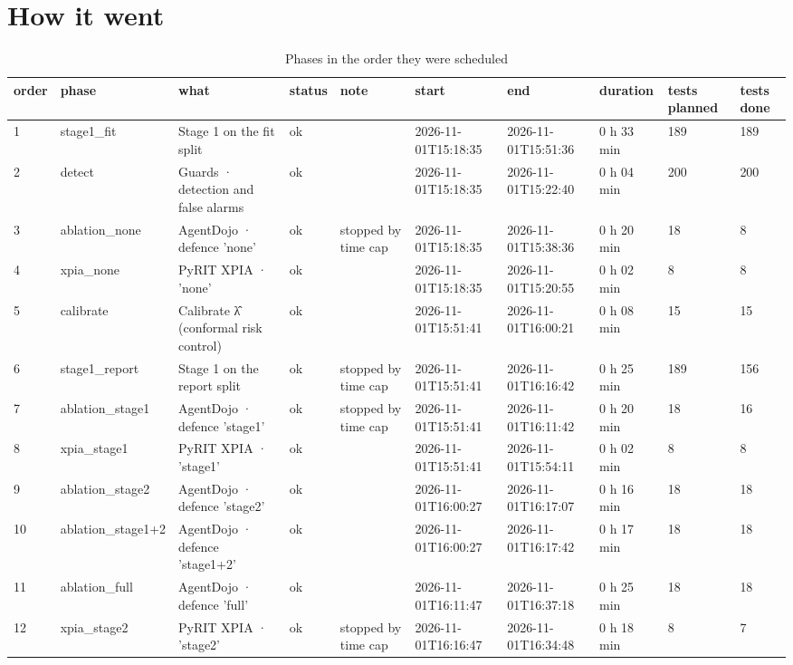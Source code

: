 \documentclass[11pt,a4paper]{article}
\begin{document}
\section*{How it went}
\begin{small}\begin{longtable}{llllllllll}
\caption{Phases in the order they were scheduled}\\
\toprule
order & phase & what & status & note & start & end & duration & tests planned & tests done \\
\midrule\endhead
1 & stage1\_fit & Stage 1 on the fit split & ok &  & 2026-11-01T15:18:35 & 2026-11-01T15:51:36 & 0 h 33 min & 189 & 189 \\
2 & detect & Guards · detection and false alarms & ok &  & 2026-11-01T15:18:35 & 2026-11-01T15:22:40 & 0 h 04 min & 200 & 200 \\
3 & ablation\_none & AgentDojo · defence 'none' & ok & stopped by time cap & 2026-11-01T15:18:35 & 2026-11-01T15:38:36 & 0 h 20 min & 18 & 8 \\
4 & xpia\_none & PyRIT XPIA · 'none' & ok &  & 2026-11-01T15:18:35 & 2026-11-01T15:20:55 & 0 h 02 min & 8 & 8 \\
5 & calibrate & Calibrate λ̂ (conformal risk control) & ok &  & 2026-11-01T15:51:41 & 2026-11-01T16:00:21 & 0 h 08 min & 15 & 15 \\
6 & stage1\_report & Stage 1 on the report split & ok & stopped by time cap & 2026-11-01T15:51:41 & 2026-11-01T16:16:42 & 0 h 25 min & 189 & 156 \\
7 & ablation\_stage1 & AgentDojo · defence 'stage1' & ok & stopped by time cap & 2026-11-01T15:51:41 & 2026-11-01T16:11:42 & 0 h 20 min & 18 & 16 \\
8 & xpia\_stage1 & PyRIT XPIA · 'stage1' & ok &  & 2026-11-01T15:51:41 & 2026-11-01T15:54:11 & 0 h 02 min & 8 & 8 \\
9 & ablation\_stage2 & AgentDojo · defence 'stage2' & ok &  & 2026-11-01T16:00:27 & 2026-11-01T16:17:07 & 0 h 16 min & 18 & 18 \\
10 & ablation\_stage1+2 & AgentDojo · defence 'stage1+2' & ok &  & 2026-11-01T16:00:27 & 2026-11-01T16:17:42 & 0 h 17 min & 18 & 18 \\
11 & ablation\_full & AgentDojo · defence 'full' & ok &  & 2026-11-01T16:11:47 & 2026-11-01T16:37:18 & 0 h 25 min & 18 & 18 \\
12 & xpia\_stage2 & PyRIT XPIA · 'stage2' & ok & stopped by time cap & 2026-11-01T16:16:47 & 2026-11-01T16:34:48 & 0 h 18 min & 8 & 7 \\

\end{longtable}
\end{small}
\end{document}
